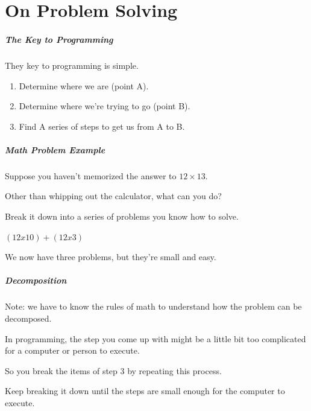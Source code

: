 \part{On Problem Solving}
\frame{\partpage}

\begin{frame}
\frametitle{The Key to Programming}
\begin{changemargin}{1cm}
They key to programming is simple.

\begin{enumerate}
\item Determine where we are (point A).
\item Determine where we're trying to go (point B).
\item Find A series of steps to get us from A to B.
\end{enumerate}

\end{changemargin}
\end{frame}

\begin{frame}
\frametitle{Math Problem Example}
\begin{changemargin}{1cm}

Suppose you haven't memorized the answer to $12 \times 13$. 

Other than whipping out the calculator, what can you do? 

Break it down into a series of problems you know how to solve.

$(12 x 10) + (12 x 3)$

We now have three problems, but they're small and easy.

\end{changemargin}
\end{frame}

\begin{frame}
\frametitle{Decomposition}
\begin{changemargin}{1cm}

Note: we have to know the rules of math to understand how the problem can be decomposed. 

In programming, the step you come up with might be a little bit too complicated for a computer or person to execute.

So you break the items of step 3 by repeating this process.

Keep breaking it down until the steps are small enough for the computer to execute.

\end{changemargin}
\end{frame}

